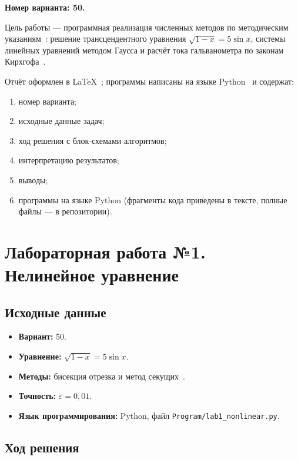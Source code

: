 \documentclass[12pt,a4paper]{scrartcl}
\begin{document}
\textbf{Номер варианта: 50.}

Цель работы --- программная реализация численных методов по методическим указаниям~\cite{Zadanie-2026}: решение трансцендентного уравнения $\sqrt{1-x}=5\sin x$, системы линейных уравнений методом Гаусса и расчёт тока гальванометра по законам Кирхгофа~\cite{Uvarov-2000, Samarsky-1989, Trofimov-2015}.

Отчёт оформлен в \LaTeX{}~\cite{Lvovsky-2003}; программы написаны на языке Python~\cite{Python-2026} и содержат:
\begin{enumerate}
 \item номер варианта;
 \item исходные данные задач;
 \item ход решения с блок-схемами алгоритмов;
 \item интерпретацию результатов;
 \item выводы;
 \item программы на языке Python (фрагменты кода приведены в тексте, полные файлы --- в репозитории).
\end{enumerate}

\newpage
\section{Лабораторная работа №1. Нелинейное уравнение}

\subsection{Исходные данные}

\begin{itemize}
 \item \textbf{Вариант:} 50.
 \item \textbf{Уравнение:} $\sqrt{1-x}=5\sin x$.
 \item \textbf{Методы:} бисекция отрезка и метод секущих~\cite{Uvarov-2000}.
 \item \textbf{Точность:} $\varepsilon = 0{,}01$.
 \item \textbf{Язык программирования:} Python, файл \texttt{Program/lab1\_nonlinear.py}.
\end{itemize}

\subsection{Ход решения}
\end{document}
